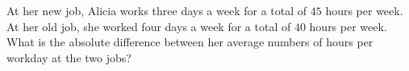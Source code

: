 At her new job, Alicia works three days a week for a total of $45$ hours per week. At her old job, she worked four days a week for a total of $40$ hours per week. What is the absolute difference between her average numbers of hours per workday at the two jobs?
